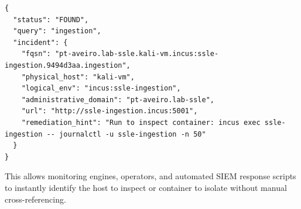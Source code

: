 \begin{lstlisting}[caption={Rapid Incident Localization Response for \texttt{ingestion}.}, label={lst:locate}]
{
  "status": "FOUND",
  "query": "ingestion",
  "incident": {
    "fqsn": "pt-aveiro.lab-ssle.kali-vm.incus:ssle-ingestion.9494d3aa.ingestion",
    "physical_host": "kali-vm",
    "logical_env": "incus:ssle-ingestion",
    "administrative_domain": "pt-aveiro.lab-ssle",
    "url": "http://ssle-ingestion.incus:5001",
    "remediation_hint": "Run to inspect container: incus exec ssle-ingestion -- journalctl -u ssle-ingestion -n 50"
  }
}
\end{lstlisting}
This allows monitoring engines, operators, and automated SIEM response scripts to instantly identify the host to inspect or container to isolate without manual cross-referencing.
